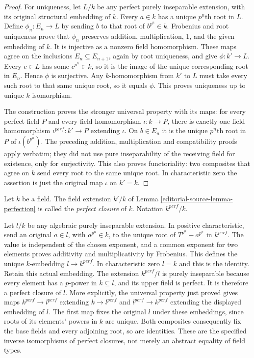 \begin{proof}
For uniqueness, let $L/k$ be any perfect purely
inseparable extension, with its original
structural embedding of $k$. Every $a\in k$
has a unique $p^n$th root in $L$. Define
$\phi_n:E_n\to L$ by sending $b$ to that
root of $b^{p^n}\in k$. Frobenius and root
uniqueness prove that $\phi_n$ preserves
addition, multiplication, $1$, and the given
embedding of $k$. It is injective as a
nonzero field homomorphism. These maps agree
on the inclusions $E_n\subseteq E_{n+1}$,
again by root uniqueness, and give
$\phi:k'\to L$. Every $c\in L$ has some
$c^{p^n}\in k$, so it is the image of the
unique corresponding root in $E_n$.
Hence $\phi$ is surjective. Any $k$-homomorphism
from $k'$ to $L$ must take every such root
to that same unique root, so it equals $\phi$.
This proves uniqueness up to unique
$k$-isomorphism.

The construction proves the stronger universal
property with its maps: for every perfect
field $P$ and every field homomorphism
$\iota:k\to P$, there is exactly one field
homomorphism $\iota^{perf}:k'\to P$ extending
$\iota$. On $b\in E_n$ it is the unique
$p^n$th root in $P$ of $\iota(b^{p^n})$.
The preceding addition, multiplication and
compatibility proofs apply verbatim; they
did not use pure inseparability of the
receiving field for existence, only for
surjectivity. This also proves functoriality:
two composites that agree on $k$ send every
root to the same unique root. In
characteristic zero the assertion is just
the original map $\iota$ on $k'=k$.
\end{proof}

\begin{definition}
\label{editorial-source-definition-perfection}
Let $k$ be a field. The field extension $k'/k$ of Lemma \ref{editorial-source-lemma-perfection}
is called the {\it perfect closure} of $k$. Notation $k^{perf}/k$.
\end{definition}

\noindent
Let $l/k$ be any algebraic purely inseparable
extension. In positive characteristic, send an
original $a\in l$, with $a^{p^n}\in k$, to
the unique root of $T^{p^n}-a^{p^n}$ in
$k^{perf}$. The value is independent of the
chosen exponent, and a common exponent for
two elements proves additivity and
multiplicativity by Frobenius. This defines
the unique $k$-embedding $l\to k^{perf}$.
In characteristic zero $l=k$ and this is
the identity. Retain this actual embedding.
The extension $k^{perf}/l$ is purely
inseparable because every element has a
$p$-power in $k\subseteq l$, and its upper
field is perfect. It is therefore a
perfect closure of $l$. More explicitly,
the universal property just proved gives
maps $k^{perf}\to l^{perf}$ extending
$k\to l^{perf}$ and $l^{perf}\to k^{perf}$
extending the displayed embedding of $l$.
The first map fixes the original $l$
under these embeddings, since roots of
its elements' powers in $k$ are unique.
Both composites consequently fix the
base fields and every adjoining root,
so are identities. These are the
specified inverse isomorphisms of
perfect closures, not merely an
abstract equality of field types.

